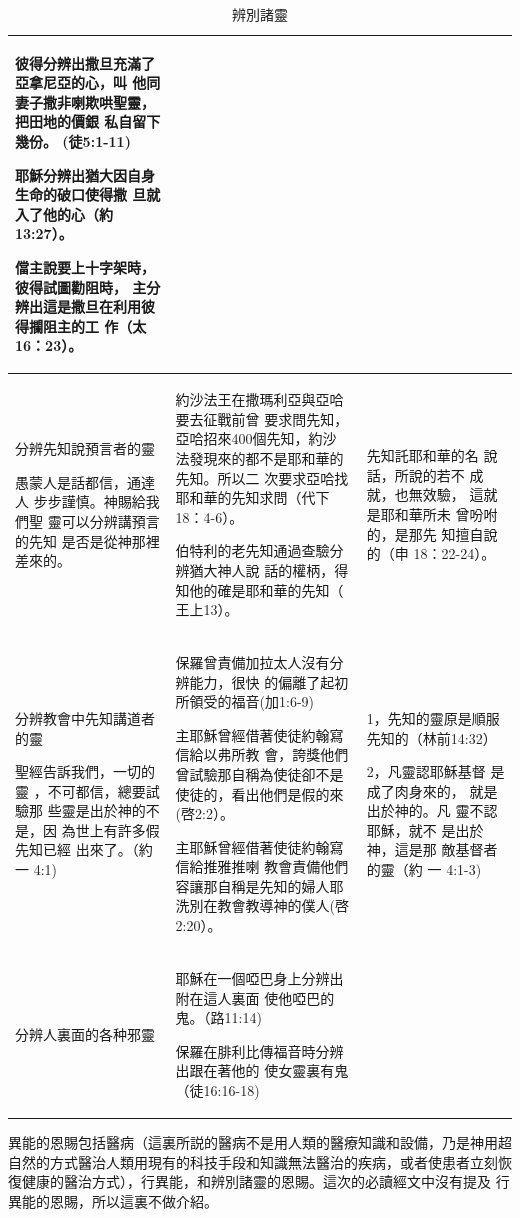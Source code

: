 \begin{table}[H]
\begin{tabular}{p{15.145em}|p{21.785em}|p{10.5em}}
彼得分辨出撒旦充滿了亞拿尼亞的心，叫
他同妻子撒非喇欺哄聖靈，把田地的價銀
私自留下幾份。 (徒5:1-11)

耶穌分辨出猶大因自身生命的破口使得撒
旦就入了他的心（約13:27）。

儅主說要上十字架時，彼得試圖勸阻時，
主分辨出這是撒旦在利用彼得攔阻主的工
作（太16：23）。&\\    \midrule

分辨先知說預言者的靈

愚蒙人是話都信，通達人
步步謹慎。神賜給我們聖
靈可以分辨講預言的先知
是否是從神那裡差來的。&

約沙法王在撒瑪利亞與亞哈要去征戰前曾
要求問先知，亞哈招來400個先知，約沙
法發現來的都不是耶和華的先知。所以二
次要求亞哈找耶和華的先知求問（代下
18：4-6）。

伯特利的老先知通過查驗分辨猶大神人說
話的權柄，得知他的確是耶和華的先知（
王上13）。&

先知託耶和華的名
說話，所說的若不
成就，也無效驗，
這就是耶和華所未
曾吩咐的，是那先
知擅自說的（申
18：22-24）。\\    \midrule

分辨教會中先知講道者的靈

聖經告訴我們，一切的靈
，不可都信，總要試驗那
些靈是出於神的不是，因
為世上有許多假先知已經
出來了。（約一 4:1)&

保羅曾責備加拉太人沒有分辨能力，很快
的偏離了起初所領受的福音(加1:6-9)

主耶穌曾經借著使徒約翰寫信給以弗所教
會，誇獎他們曾試驗那自稱為使徒卻不是
使徒的，看出他們是假的來(啓2:2）。 

主耶穌曾經借著使徒約翰寫信給推雅推喇
教會責備他們容讓那自稱是先知的婦人耶
洗別在教會教導神的僕人(啓2:20）。 &

1，先知的靈原是順服先知的（林前14:32）

2，凡靈認耶穌基督
是成了肉身來的，
就是出於神的。凡
靈不認耶穌，就不
是出於神，這是那
敵基督者的靈（約
一 4:1-3)\\    \midrule

分辨人裏面的各种邪靈&
耶穌在一個啞巴身上分辨出附在這人裏面
使他啞巴的鬼。（路11:14)

保羅在腓利比傳福音時分辨出跟在著他的
使女靈裏有鬼（徒16:16-18)&
\\    \bottomrule
    \end{tabular}%
     \caption{辨別諸靈}
  \label{tab:addlabel}%
\end{table}%


異能的恩賜包括醫病（這裏所説的醫病不是用人類的醫療知識和設備，乃是神用超自然的方式醫治人類用現有的科技手段和知識無法醫治的疾病，或者使患者立刻恢復健康的醫治方式），行異能，和辨別諸靈的恩賜。這次的必讀經文中沒有提及
行異能的恩賜，所以這裏不做介紹。

